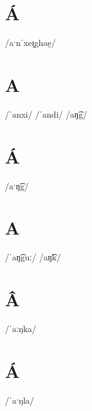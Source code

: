 \documentclass[10pt,a4paper,twoside]{book}
\begin{document}
\section*{Á}

\begin{multicols}{3}
 {/aˑnˈxeɪ̯ghae̯/} {}
\end{multicols}

\section*{A}

\begin{multicols}{3}
 {/ˈanxi/} {}
 {/ˈandi/} {}
 {/aŋ͡g/} {}
\end{multicols}

\section*{Á}

\begin{multicols}{3}
 {/aˑŋ͡g/} {}
\end{multicols}

\section*{A}

\begin{multicols}{3}
 {/ˈaŋ͡guː/} {}
 {/aŋ͡k/} {}
\end{multicols}

\section*{Â}

\begin{multicols}{3}
 {/ˈaːŋka/} {}
\end{multicols}

\section*{Á}

\begin{multicols}{3}
 {/ˈaˑŋla/} {}
\end{multicols}
\end{document}
